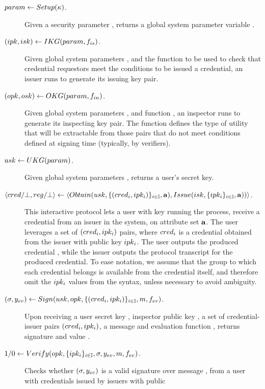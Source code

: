\begin{description}
\item[$param \gets Setup(\kappa)$.] Given a security parameter \secpar,
  returns a global system parameter variable \parm.
\item[$(ipk,isk) \gets IKG(param,f_{is})$.] Given global system
  parameters \parm, and the function \fissue to be used to check that credential
  requestors meet the conditions to be issued a credential, an issuer runs
  \IKeyGen to generate its issuing key pair. 
\item[$(opk,osk) \gets OKG(param,f_{in})$.] Given global system
  parameters \parm, and function \finsp, an inspector runs \OKeyGen to generate
  its inspecting key pair. The function \finsp defines the type of utility that
  will be extractable from those pairs that do not meet conditions defined
  at signing time (typically, by verifiers).
\item[$usk \gets UKG(param)$.] Given global system parameters
  \parm, returns a user's secret key.
\item[$\langle cred/\bot,reg/\bot \rangle \gets
  \langle
  Obtain(usk,\lbrace (cred_i,ipk_i)\rbrace_{i \in \mathbb{I}},\mathbf{a}),
  Issue(isk,\lbrace ipk_i \rbrace_{i \in \mathbb{I}},\mathbf{a}))
  \rangle$.] %
  This interactive protocol lets a user with key \usk running the
  \Obtain process, receive a credential \cred from an issuer in the system, on
  attribute set $\mathbf{a}$. The user leverages a set of $(cred_i,ipk_i)$ pairs,
  where $cred_i$ is a credential obtained from the issuer with public
  key $ipk_i$. The user outputs the produced credential \cred, while
  the issuer outputs the protocol transcript \utrans for the produced
  credential. To ease notation, we assume that the group to which each
  credential belongs is available from the credential itself, and therefore
  omit the $ipk_i$ values from the syntax, unless necessary to avoid ambiguity.
\item[$(\sigma,y_{ev}) \gets Sign(usk,opk,\lbrace (cred_i,ipk_i)
  \rbrace_{i \in \mathbb{I}},m,f_{ev})$.] %
  Upon receiving a user secret key \usk, inspector public key \opk, a set of
  credential-issuer pairs $(cred_i,ipk_i)$, a message \msg and evaluation
  function \feval, returns signature \sig and value \yeval.
\item[$1/0 \gets Verify(opk, \lbrace ipk_i \rbrace_{i \in \mathbb{I}},\sigma,
  y_{ev},m,f_{ev})$.] Checks whether $(\sigma,y_{ev})$ is a valid signature
  over message \msg, from a user with credentials issued by issuers with public

\end{description}
